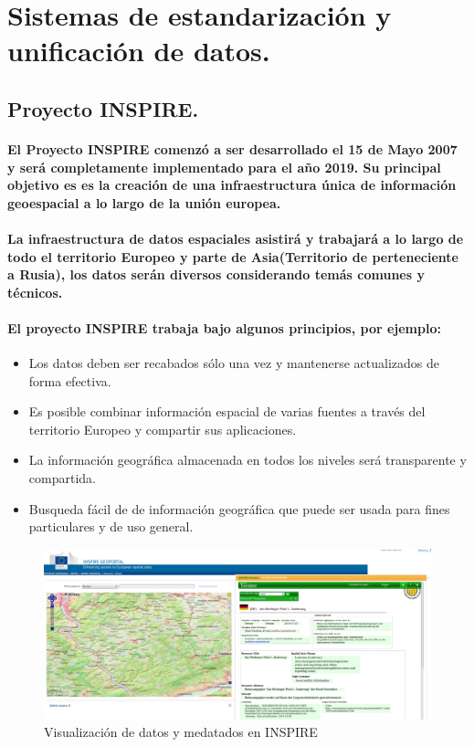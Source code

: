 \section{Sistemas de estandarización y unificación de datos.}
  \subsection{Proyecto INSPIRE.}
    \paragraph{El Proyecto INSPIRE comenzó a ser desarrollado el 15 de Mayo 2007 y será completamente implementado para el año 2019. Su principal objetivo es es la creación de una infraestructura única de información geoespacial a lo largo de la unión europea.} 
    \paragraph{La infraestructura de datos espaciales asistirá y trabajará a lo largo de todo el territorio Europeo y parte de Asia(Territorio de perteneciente a Rusia), los datos serán diversos considerando temás comunes y técnicos.}
    \paragraph{El proyecto INSPIRE trabaja bajo algunos principios, por ejemplo:}
    \begin{itemize}
      \item Los datos deben ser recabados sólo una vez y mantenerse actualizados de forma efectiva.
      \item Es posible combinar información espacial de varias fuentes a través del territorio Europeo y compartir sus aplicaciones.
      \item La información geográfica almacenada en todos los niveles será transparente y compartida.
      \item Busqueda fácil de de información geográfica que puede ser usada para fines particulares y de uso general.
    \end{itemize}
    \begin{figure}[h!]
        \centering
          \includegraphics[width=\textwidth]{./images/INSPIRE.png}
        \caption{Visualización de datos y medatados en INSPIRE}
    \end{figure}
